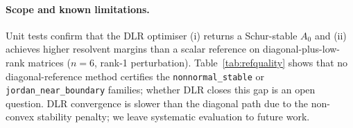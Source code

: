 \documentclass{article}
\theoremstyle{definition}
\begin{document}
\paragraph{Scope and known limitations.}
Unit tests confirm that the DLR optimiser (i) returns a Schur-stable
$A_0$ and (ii) achieves higher resolvent margins than a scalar reference
on diagonal-plus-low-rank matrices ($n=6$, rank-1 perturbation).
Table~\ref{tab:refquality} shows that no diagonal-reference method
certifies the \texttt{nonnormal\_stable} or \texttt{jordan\_near\_boundary}
families; whether DLR closes this gap is an open question.  DLR
convergence is slower than the diagonal path due to the non-convex
stability penalty; we leave systematic evaluation to future work.



\end{document}
